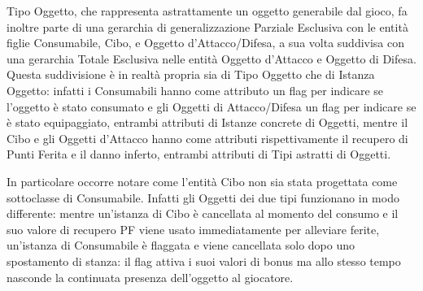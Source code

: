\documentclass[10pt,a4paper]{article}
\begin{document}
Tipo Oggetto, che rappresenta astrattamente un oggetto generabile dal gioco, fa inoltre parte di una gerarchia di generalizzazione Parziale Esclusiva con le entità figlie Consumabile, Cibo, e Oggetto d'Attacco/Difesa, a sua volta suddivisa con una gerarchia Totale Esclusiva nelle entità Oggetto d'Attacco e Oggetto di Difesa. Questa suddivisione è in realtà propria sia di Tipo Oggetto che di Istanza Oggetto: infatti i Consumabili hanno come attributo un flag per indicare se l'oggetto è stato consumato e gli Oggetti di Attacco/Difesa un flag per indicare se è stato equipaggiato, entrambi attributi di Istanze concrete di Oggetti, mentre il Cibo e gli Oggetti d'Attacco hanno come attributi rispettivamente il recupero di Punti Ferita e il danno inferto, entrambi attributi di Tipi astratti di Oggetti.

In particolare occorre notare come l'entità Cibo non sia stata progettata come sottoclasse di Consumabile. Infatti gli Oggetti dei due tipi funzionano in modo differente: mentre un'istanza di Cibo è cancellata al momento del consumo e il suo valore di recupero PF viene usato immediatamente per alleviare ferite, un'istanza di Consumabile è flaggata e viene cancellata solo dopo uno spostamento di stanza: il flag attiva i suoi valori di bonus ma allo stesso tempo nasconde la continuata presenza dell'oggetto al giocatore.

\newpage 
\end{document}
